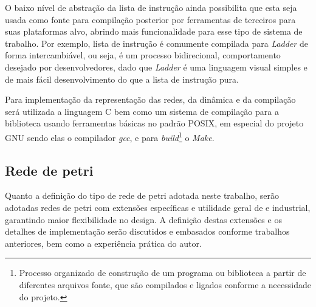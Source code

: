 O baixo nível de abstração da lista de instrução ainda possibilita que esta seja usada como fonte para compilação posterior por ferramentas de terceiros para suas plataformas alvo, abrindo mais funcionalidade para esse tipo de sistema de trabalho. Por exemplo, lista de instrução é comumente compilada para \textit{Ladder} de forma intercambiável, ou seja, é um processo bidirecional, comportamento desejado por desenvolvedores, dado que \textit{Ladder} é uma linguagem visual simples e de mais fácil desenvolvimento do que a lista de instrução pura.

Para implementação da representação das redes, da dinâmica e da compilação será utilizada a linguagem C bem como um sistema de compilação para a biblioteca usando ferramentas básicas no padrão POSIX\nocite{posix}, em especial do projeto GNU \cite{gnu} sendo elas o compilador \textit{gcc}, e para \textit{build}\footnote{Processo organizado de construção de um programa ou biblioteca a partir de diferentes arquivos fonte, que são compilados e ligados conforme a necessidade do projeto.} o \textit{Make}.




\subsection{Rede de petri}

Quanto a definição do tipo de rede de petri adotada neste trabalho, serão adotadas redes de petri com extensões específicas e utilidade geral de e industrial, garantindo maior flexibilidade no design. A definição destas extensões e os detalhes de implementação serão discutidos e embasados conforme trabalhos anteriores, bem como a experiência prática do autor.

